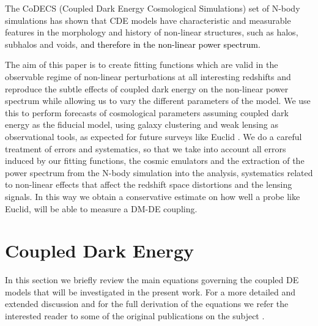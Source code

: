 The CoDECS (Coupled Dark Energy Cosmological Simulations) set of N-body
simulations \citep{baldi_codecs_2012} has shown that CDE models have
characteristic and measurable features in the morphology and history
of non-linear structures, such as halos, subhalos and voids,\textcolor{black}{{}
and therefore in the non-linear power spectrum.}

The aim of this paper is to create fitting functions which are valid
in the observable regime of non-linear perturbations at all interesting
redshifts and reproduce the subtle effects of coupled dark energy
on the non-linear power spectrum while allowing us to vary the different
parameters of the model. We use this to perform forecasts of cosmological
parameters assuming coupled dark energy as the fiducial model, using
galaxy clustering and weak lensing as observational tools, as expected
for future surveys like Euclid \cite{laureijs_euclid_2011,amendola_cosmology_2012-short}.
We do a careful treatment of errors and systematics, so that we take
into account all errors induced by our fitting functions, the cosmic
emulators and the extraction of the power spectrum from the N-body
simulation into the analysis, systematics related to non-linear effects
that affect the redshift space distortions and the lensing signals.
In this way we obtain a conservative estimate on how well a probe
like Euclid, will be able to measure a DM-DE coupling.


\section{Coupled Dark Energy\label{sec:Coupled-Dark-Energy}}

In this section we briefly review the main equations governing the
coupled DE models that will be investigated in the present work. For
a more detailed and extended discussion and for the full derivation
of the equations we refer the interested reader to some of the original
publications on the subject \citep{Amendola_2000,Amendola_2004,pettorino_baccigalupi_2008,baldi_etal_2010}.



